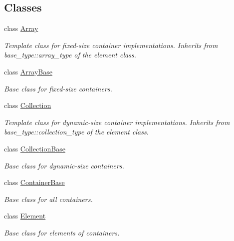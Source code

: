 \subsection*{Classes}
\begin{DoxyCompactItemize}
\item 
class \hyperlink{classpanda_1_1Array}{Array}
\begin{DoxyCompactList}\small\item\em Template class for fixed-\/size container implementations. Inherits from base\_\-type::array\_\-type of the element class. \item\end{DoxyCompactList}\item 
class \hyperlink{classpanda_1_1ArrayBase}{ArrayBase}
\begin{DoxyCompactList}\small\item\em Base class for fixed-\/size containers. \item\end{DoxyCompactList}\item 
class \hyperlink{classpanda_1_1Collection}{Collection}
\begin{DoxyCompactList}\small\item\em Template class for dynamic-\/size container implementations. Inherits from base\_\-type::collection\_\-type of the element class. \item\end{DoxyCompactList}\item 
class \hyperlink{classpanda_1_1CollectionBase}{CollectionBase}
\begin{DoxyCompactList}\small\item\em Base class for dynamic-\/size containers. \item\end{DoxyCompactList}\item 
class \hyperlink{classpanda_1_1ContainerBase}{ContainerBase}
\begin{DoxyCompactList}\small\item\em Base class for all containers. \item\end{DoxyCompactList}\item 
class \hyperlink{classpanda_1_1Element}{Element}
\begin{DoxyCompactList}\small\item\em Base class for elements of containers. \item\end{DoxyCompactList}\item 

\end{DoxyCompactItemize}
